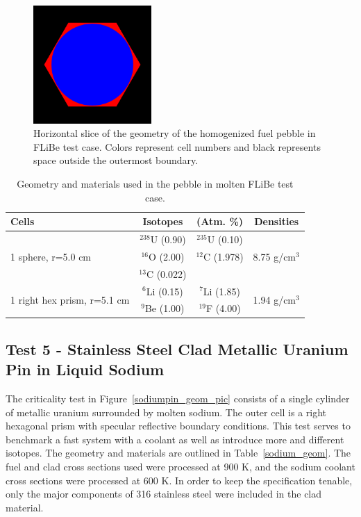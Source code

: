 \documentclass[preprint,12pt]{elsarticle}
\begin{document}
\begin{figure}[!htbp] 
  \centering
    \includegraphics[width=0.4\textwidth]{graphics/flibe-xy.png}
     \caption{ Horizontal slice of the geometry of the homogenized fuel pebble in FLiBe test case.  Colors represent cell numbers and black represents space outside the outermost boundary. \label{flibe_geom_pic} }
\end{figure}

\begin{table}[h]
\centering
\caption{Geometry and materials used in the pebble in molten FLiBe test case.}
\label{pebble_geom}
\begin{tabular}{| l | c  c | c |}
\hline
Cells & Isotopes & (Atm.  \%)& Densities \\
\hline
\multirow{3}{*}{1 sphere, r=5.0 cm }  &   $^{238}$U   (0.90) &  $^{235}$U   (0.10) &  \multirow{3}{*}{8.75 g/cm$^3$} \\
                                      &   $^{16}$O    (2.00) &  $^{12}$C    (1.978) &  \\
                                      &   $^{13}$C    (0.022)&                     &  \\
\hline
\multirow{2}{*}{1 right hex prism, r=5.1 cm }  &   $^{6}$Li  (0.15) &  $^{7}$Li  (1.85)&  \multirow{2}{*}{1.94 g/cm$^3$} \\
                                               &  $^{9}$Be  (1.00) & $^{19}$F  (4.00) &  \\
\hline
\end{tabular}
\end{table}

\newpage
\subsection{Test 5 - Stainless Steel Clad Metallic Uranium Pin in Liquid Sodium}

The criticality test in Figure~\ref{sodiumpin_geom_pic} consists of a single cylinder of metallic uranium surrounded by molten sodium.  The outer cell is a right hexagonal prism with specular reflective boundary conditions.  This test serves to benchmark a fast system with a coolant as well as introduce more and different isotopes.  The geometry and materials are outlined in Table~\ref{sodium_geom}.  The fuel and clad cross sections used were processed at 900 K, and the sodium coolant cross sections were processed at 600 K.  In order to keep the specification tenable, only the major components of 316 stainless steel were included in the clad material. 
\end{document}
